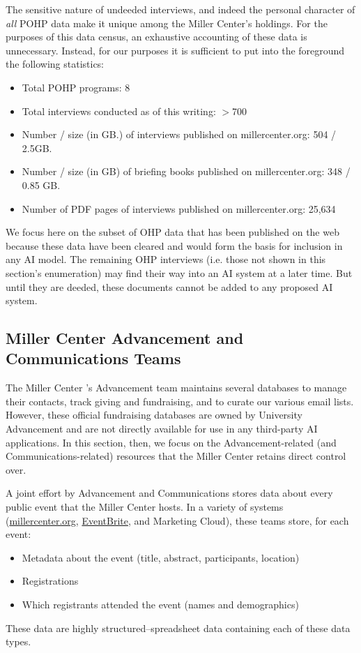 \documentclass[12pt, oneside]{article}   	%
\begin{document}
The sensitive nature of undeeded interviews, and indeed the personal character of \emph{all} POHP data make it unique among the Miller Center’s holdings.  For the purposes of this data census, an exhaustive accounting of these data is unnecessary.  Instead, for our purposes it is sufficient to put into the foreground the following statistics:
\begin{itemize}
\item Total POHP programs:  8
\item Total interviews conducted as of this writing: $>$700
\item Number / size (in GB.) of interviews published on millercenter.org:  504 / 2.5GB.
\item Number / size (in GB) of briefing books published on millercenter.org: 348 / 0.85 GB.
\item Number of PDF pages of interviews published on millercenter.org: 25,634
\end{itemize}
We focus here on the subset of OHP data that has been published on the web because these data have been cleared and would form the basis for inclusion in any AI model.  The remaining OHP interviews (i.e. those not shown in this section's enumeration) may find their way into an AI system at a later time.  But until they are deeded, these documents cannot be added to any proposed AI system.

 


\subsection{Miller Center Advancement and Communications Teams}\label{section.data.advancement}
The Miller Center 's Advancement team maintains several databases to manage their contacts, track giving and fundraising, and to curate our various email lists.  However, these official fundraising databases are owned by University Advancement and are not directly available for use in any third-party AI applications.  In this section, then, we focus on the Advancement-related (and Communications-related) resources that the Miller Center retains direct control over.

A joint effort by Advancement and Communications stores data about every public event that the Miller Center hosts.  In a variety of systems (\url{millercenter.org}, \href{eventbrite.com}{EventBrite}, and Marketing Cloud), these teams store, for each event:
\begin{itemize}
\item Metadata about the event (title, abstract, participants, location)
\item Registrations
\item Which registrants attended the event (names and demographics)
\end{itemize}
These data are highly structured--spreadsheet data containing each of these data types.  
\end{document}
